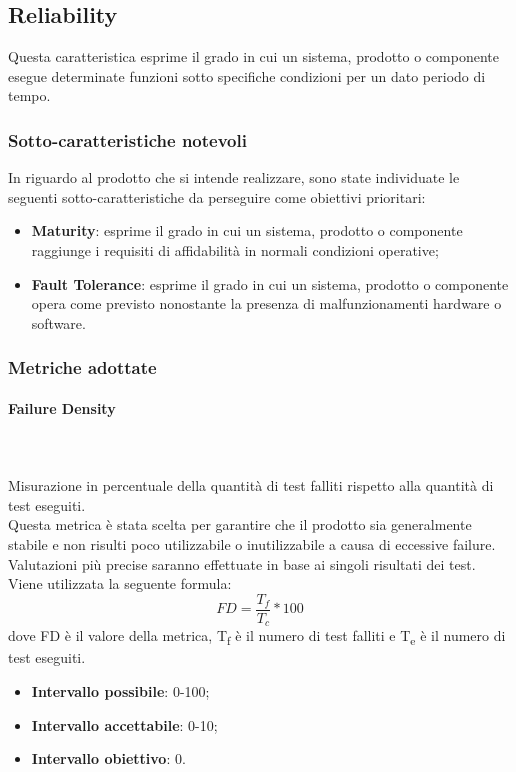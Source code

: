 \subsection{Reliability}
Questa caratteristica esprime il grado in cui un sistema, prodotto o componente esegue determinate funzioni sotto specifiche condizioni per un dato periodo di tempo.
\subsubsection{Sotto-caratteristiche notevoli}
In riguardo al prodotto che si intende realizzare, sono state individuate le seguenti sotto-caratteristiche da perseguire come obiettivi prioritari: 
\begin{itemize}
	\item{\textbf{Maturity}}: esprime il grado in cui un sistema, prodotto o componente raggiunge i requisiti di affidabilità in normali condizioni operative;
	\item{\textbf{Fault Tolerance}}: esprime il grado in cui un sistema, prodotto o componente opera come previsto nonostante la presenza di malfunzionamenti hardware o software.
\end{itemize}
\subsubsection{Metriche adottate}
\paragraph{Failure Density}  ~\\ ~\\
Misurazione in percentuale della quantità di test falliti rispetto alla quantità di test eseguiti.
\\Questa metrica è stata scelta per garantire che il prodotto sia generalmente stabile e non risulti poco utilizzabile o inutilizzabile a causa di eccessive failure. Valutazioni più precise saranno effettuate in base ai singoli risultati dei test.\\
Viene utilizzata la seguente formula:
$$FD=\frac{T_f}{T_c}*100$$
dove FD è il valore della metrica, T\textsubscript{f} è il numero di test falliti e T\textsubscript{e} è il numero di test eseguiti.
\begin{itemize}
	\item{\textbf{Intervallo possibile}: 0-100;}
	\item{\textbf{Intervallo accettabile}: 0-10;}
	\item{\textbf{Intervallo obiettivo}: 0.}
\end{itemize}

